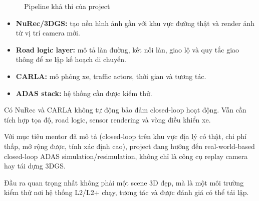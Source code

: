 \begin{figure}[H]
  \centering
  \caption{Pipeline khả thi của project}
\end{figure}

\begin{itemize}
  \item \textbf{NuRec/3DGS:} tạo nền hình ảnh gần với khu vực đường thật và render ảnh từ vị trí camera mới.
  \item \textbf{Road logic layer:} mô tả làn đường, kết nối làn, giao lộ và quy tắc giao thông để xe lập kế hoạch di chuyển.
  \item \textbf{CARLA:} mô phỏng xe, traffic actors, thời gian và tương tác.
  \item \textbf{ADAS stack:} hệ thống cần được kiểm thử.
\end{itemize}

\begin{warning}
Có NuRec và CARLA không tự động bảo đảm closed-loop hoạt động.
Vẫn cần tích hợp tọa độ, road logic, sensor rendering và vòng điều khiển xe.
\end{warning}

\begin{keyidea}
Với mục tiêu mentor đã mô tả (closed-loop trên khu vực địa lý có thật, chi phí thấp, mở rộng được, tính xác định cao), project đang hướng đến real-world-based closed-loop ADAS simulation/resimulation, không chỉ là công cụ replay camera hay tái dựng 3DGS.

Đầu ra quan trọng nhất không phải một scene 3D đẹp, mà là một môi trường kiểm thử nơi hệ thống L2/L2+ chạy, tương tác và được đánh giá có thể tái lập.
\end{keyidea}
